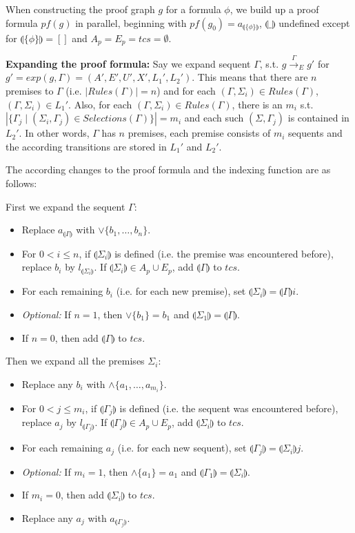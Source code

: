 \documentclass{llncs}
\newcommand{\ind}[1]{\llparenthesis #1 \rrparenthesis}
\begin{document}
When constructing the proof graph $g$ for a formula $\phi$, we build up a proof formula
$pf(g)$ in parallel, beginning with $pf(g_0)=a_{\ind{\{\phi\}}}$, $\ind{\_}$ undefined except
for $\ind{\{\phi\}}=[]$ and $A_p=E_p=tcs=\emptyset$.

\noindent\textbf{Expanding the proof formula:} 
Say we expand sequent $\Gamma$, s.t. $g\stackrel{\Gamma}\rightarrow_E g'$ for $g'=exp(g,\Gamma)=(A',E',U',X',L_1',L_2')$.
This means that there are $n$ premises to $\Gamma$ (i.e. $|Rules(\Gamma)|=n$) and for each $(\Gamma,\Sigma_i) \in Rules(\Gamma)$,
$(\Gamma,\Sigma_i)\in L_1'$. Also, for each $(\Gamma,\Sigma_i) \in Rules(\Gamma)$, there is an $m_i$ s.t.
$|\{\Gamma_j\mid (\Sigma_i,\Gamma_j)\in Selections(\Gamma)\}|=m_i$ and each such $(\Sigma,\Gamma_j)$ is contained in $L_2'$.
In other words, $\Gamma$ has $n$ premises, each premise consists of $m_i$ sequents and the according
transitions are stored in $L_1'$ and $L_2'$.

The according changes to the proof formula and the indexing function are as follows:

\noindent First we expand the sequent $\Gamma$:
\begin{itemize}
\item Replace $a_{\ind{\Gamma}}$ with $\vee\{b_1,\ldots,b_n\}$.
\item For $0<i\leq n$, if $\ind{\Sigma_i}$ is defined (i.e. the premise was encountered before),
replace $b_i$ by $l_{\ind{\Sigma_i}}$. If $\ind{\Sigma_i}\in A_p\cup E_p$, add $\ind{\Gamma}$ to $tcs$.
\item For each remaining $b_i$ (i.e. for each new premise), set $\ind{\Sigma_i}=\ind{\Gamma}i$.
\item \emph{Optional:} If $n=1$, then $\vee\{b_1\}=b_1$ and $\ind{\Sigma_1}=\ind{\Gamma}$.
\item If $n=0$, then add $\ind{\Gamma}$ to $tcs$.
\end{itemize}

\noindent Then we expand all the premises $\Sigma_i$:
\begin{itemize}
\item Replace any $b_i$ with $\wedge\{a_1,\ldots,a_{m_i}\}$.
\item For $0<j\leq m_i$, if $\ind{\Gamma_j}$ is defined (i.e. the sequent was encountered before), 
replace $a_j$ by $l_{\ind{\Gamma_j}}$. If $\ind{\Gamma_j}\in A_p\cup E_p$, add $\ind{\Sigma_i}$ to $tcs$.
\item For each remaining $a_j$ (i.e. for each new sequent), set $\ind{\Gamma_j}=\ind{\Sigma_i}j$.
\item \emph{Optional:} If $m_i=1$, then $\wedge\{a_1\}=a_1$ and $\ind{\Gamma_1}=\ind{\Sigma_i}$.
\item If $m_i=0$, then add $\ind{\Sigma_i}$ to $tcs$.
\item Replace any $a_j$ with $a_{\ind{\Gamma_j}}$.
\end{itemize}
\end{document}

